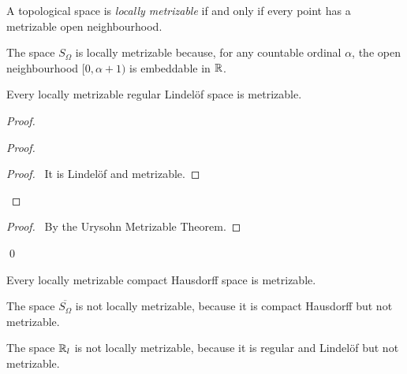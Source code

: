 \begin{definition}
    A topological space is \emph{locally metrizable} if and only if
    every point has a metrizable open neighbourhood.
\end{definition}

\begin{example}
    The space $S_\Omega$ is locally metrizable because, for any countable ordinal $\alpha$,
    the open neighbourhood $[0,\alpha + 1)$ is embeddable in $\mathbb{R}$.
\end{example}

\begin{proposition}
    Every locally metrizable regular Lindel\"{o}f space is metrizable.
\end{proposition}

\begin{proof}
    \pf
    \begin{proof}
        \begin{proof}
            \pf\ It is Lindel\"{o}f and metrizable.
        \end{proof}
    \end{proof}
    \begin{proof}
        \pf\ By the Urysohn Metrizable Theorem.
    \end{proof}
    \qed
\end{proof}

\begin{corollary}
    Every locally metrizable compact Hausdorff space is metrizable.
\end{corollary}

\begin{example}
    The space $\overline{S_\Omega}$ is not locally metrizable, because it is compact Hausdorff but not metrizable.
\end{example}

\begin{example}
    The space $\mathbb{R}_l$ is not locally metrizable, because it is regular and Lindel\"{o}f but not metrizable.
\end{example}

